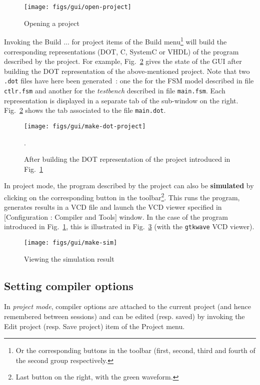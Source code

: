 \begin{figure}[h]
  \centering
  \texttt{[image: figs/gui/open-project]}
  \caption{Opening a project}
  \label{fig:open-project}
\end{figure}

Invoking the \textsf{Build ... for project} items of the \textsf{Build} menu\footnote{Or the
  corresponding buttons in the toolbar (first, second, third and fourth of the second group
  respectively.} will build the corresponding representations (DOT, C, SystemC or VHDL) of the
program described by the project.  For example, Fig.~\ref{fig:make-dot-project} gives the state of
the GUI after building the DOT representation of the above-mentioned project. Note that two
\verb|.dot| files have here been generated~: one the for the FSM model described in file
\verb|ctlr.fsm| and another for the \emph{testbench} described in file \verb|main.fsm|. Each
representation is displayed in a separate tab of the sub-window on the
right. Fig.~\ref{fig:make-dot-project} shows the tab associated to the file \verb|main.dot|. 

\begin{figure}[h]
  \centering
  \texttt{[image: figs/gui/make-dot-project]}
  \caption{After building the DOT representation of the project introduced in
    Fig.~\ref{fig:open-project}}.
  \label{fig:make-dot-project}
\end{figure}


\medskip
In project mode, the program described by the project can also be \textbf{simulated} by clicking on
the corresponding button in the toolbar\footnote{Last button on the right, with the green
  waveform.}. This runs the program, generates results in a VCD file and launch the VCD viewer specified in 
  [\textsf{Configuration : Compiler and Tools}] window. In the case of the program introduced in
  Fig.~\ref{fig:open-project}, this is illustrated in Fig.~\ref{fig:make-sim} (with the
  \verb|gtkwave| VCD viewer).

\begin{figure}[h]
  \centering
  \texttt{[image: figs/gui/make-sim]}
  \caption{Viewing the simulation result}
  \label{fig:make-sim}
\end{figure}

\subsection{Setting compiler options}
\label{sec:gui-project-options}

In \emph{project mode}, compiler options are attached to the current project (and hence remembered
between sessions) and can be edited (resp. saved) by invoking the \textsf{Edit project}
(resp. \textsf{Save project}) item of the \textsf{Project} menu.


